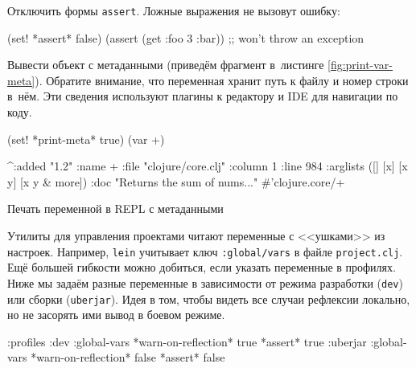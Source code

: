 \fi

Отключить формы \verb|assert|. Ложные выражения не вызовут ошибку:

\begin{english}
  \begin{clojure}
(set! *assert* false)
(assert (get {:foo 3} :bar))
;; won't throw an exception
  \end{clojure}
\end{english}

Вывести объект с метаданными (приведём фрагмент в~листинге
\ref{fig:print-var-meta}). Обратите внимание, что переменная хранит путь к файлу
и номер строки в~нём. Эти сведения используют плагины к редактору и IDE для
навигации по коду.

\begin{listing}[ht!]

\begin{english}
  \begin{clojure}
(set! *print-meta* true)
(var +)

^{:added "1.2"
  :name +
  :file "clojure/core.clj"
  :column 1
  :line 984
  :arglists ([] [x] [x y] [x y & more])
  :doc "Returns the sum of nums..."}
#'clojure.core/+
  \end{clojure}
\end{english}

\caption{Печать переменной в REPL с метаданными}
\label{fig:print-var-meta}

\end{listing}


Утилиты для управления проектами читают переменные с <<ушками>> из
настроек. Например, \verb|lein| учитывает ключ \texttt{:global\-/vars} в файле
\verb|project.clj|. Ещё большей гибкости можно добиться, если указать переменные
в профилях. Ниже мы задаём разные переменные в зависимости от режима разработки
(\verb|dev|) или сборки (\verb|uberjar|). Идея в том, чтобы видеть все случаи
рефлексии локально, но не засорять ими вывод в боевом режиме.

\ifnarrow

\begin{english}
  \begin{clojure}
{:profiles
 :dev {:global-vars
       {*warn-on-reflection* true
        *assert* true}}
 :uberjar {:global-vars
           {*warn-on-reflection* false
            *assert* false}}}
  \end{clojure}
\end{english}

